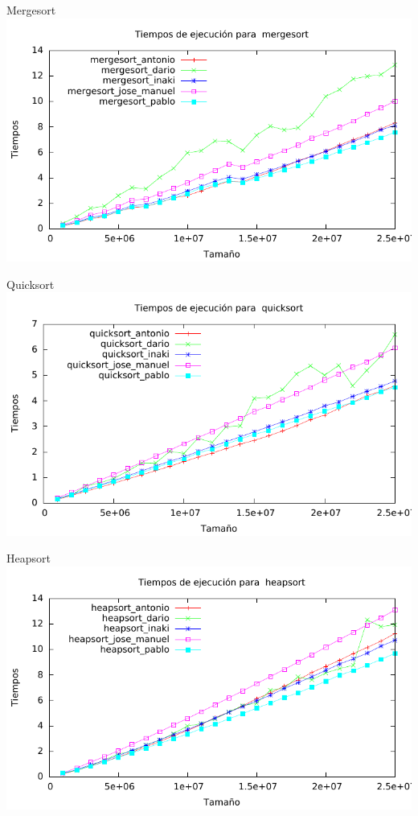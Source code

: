 \documentclass[10pt,compress,usetitleprogressbar,mathserif]{beamer}
\begin{document}
\begin{frame}{Mergesort}
	\includegraphics[width = \textwidth ]{mergesort_todos_g}
\end{frame}

\begin{frame}{Quicksort}
	\includegraphics[width = \textwidth ]{quicksort_todos_g}
\end{frame}

\begin{frame}{Heapsort}
	\includegraphics[width = \textwidth ]{heapsort_todos_g}
\end{frame}
\end{document}
